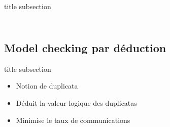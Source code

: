 \begin{frame}{title subsection}
\begin{columns}
\begin{column}{1\textwidth}
\begin{figure}
		\end{figure}		
	\end{column} 
	
\end{columns}
\end{frame}
\subsection{Model checking par déduction}
\begin{frame}{title subsection}
	\begin{block}
	
	\begin{itemize}
		\item Notion de duplicata
		\item Déduit la valeur logique des duplicatas
		\item Minimise le taux de communications
	\end{itemize}
	\end{block}
\end{frame}

